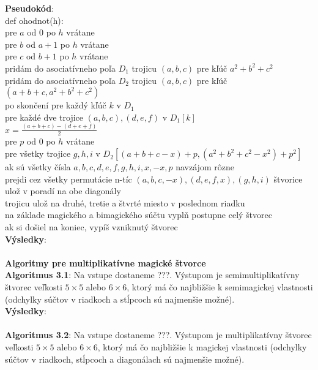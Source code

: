\documentclass[12pt]{article}
\begin{document}
\textbf{Pseudokód}: \\
def ohodnot(h): \\
pre $a$ od $0$ po $h$ vrátane \\
pre $b$ od $a+1$ po $h$ vrátane \\
pre $c$ od $b+1$ po $h$ vrátane \\
pridám do asociatívneho poľa $D_1$ trojicu $(a,b,c)$ pre kľúč $a^2+b^2+c^2$ \\
pridám do asociatívneho poľa $D_2$ trojicu $(a,b,c)$ pre kľúč $(a+b+c,a^2+b^2+c^2)$ \\
po skončení pre každý kľúč $k$ v $D_1$ \\
pre každé dve trojice $(a,b,c), (d,e,f)$ v $D_1[k]$ \\
$x = \frac{(a+b+c) - (d+e+f)}{2}$ \\
pre $p$ od $0$ po $h$ vrátane \\
pre všetky trojice $g,h,i$ v $D_2[(a+b+c-x)+p, (a^2+b^2+c^2-x^2)+p^2]$ \\
ak sú všetky čísla $a,b,c,d,e,f,g,h,i,x,-x,p$ navzájom rôzne \\
prejdi cez všetky permutácie n-tíc $(a,b,c,-x), (d,e,f,x), (g,h,i)$
štvorice ulož v poradí na obe diagonály \\
trojicu ulož na druhé, tretie a štvrté miesto v poslednom riadku \\
na základe magického a bimagického súčtu vyplň postupne celý štvorec \\
ak si došiel na koniec, vypíš vzniknutý štvorec \\

\textbf{Výsledky}: \\\\

\textbf{Algoritmy pre multiplikatívne magické štvorce} \\

\textbf{Algoritmus 3.1}: Na vstupe dostaneme ???. Výstupom je semimultiplikatívny štvorec veľkosti $5 \times 5$ alebo $6 \times 6$, ktorý má čo najbližšie k semimagickej vlastnosti (odchylky súčtov v riadkoch a stĺpcoch sú najmenšie možné). \\

\textbf{Výsledky}: \\\\

\textbf{Algoritmus 3.2}: Na vstupe dostaneme ???. Výstupom je multiplikatívny štvorec veľkosti $5 \times 5$ alebo $6 \times 6$, ktorý má čo najbližšie k magickej vlastnosti (odchylky súčtov v riadkoch, stĺpcoch a diagonálach sú najmenšie možné). \\
\end{document}
